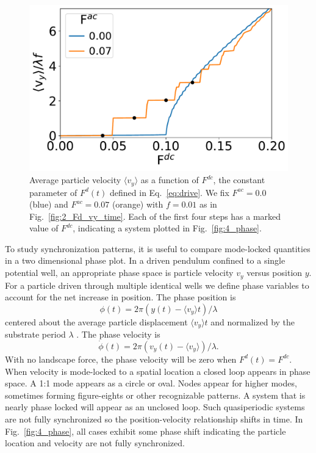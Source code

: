 \documentclass[twocolumn,preprintnumbers,amsmath,amssymb,aps,prb]{revtex4}
\begin{document}
\begin{figure} %
\centering
\includegraphics[width=\columnwidth]{fig3_sweep_vyFDC.pdf}
\caption{Average particle velocity  $\langle v_{y} \rangle$
  as a function of $F^{dc}$, 
  the constant parameter of $F^d(t)$ defined in Eq.~\ref{eq:drive}.
  We fix
  $F^{ac}=0.0$ (blue) and 
  $F^{ac}=0.07$ (orange) with $f = 0.01$ 
  as in Fig.~\ref{fig:2_Fd_vy_time}.
  Each of the first four steps
  has a marked value of $F^{dc}$,
  indicating a system
  plotted in Fig.~\ref{fig:4_phase}.
}
\label{fig:3_sweep_vyFDC}
\end{figure}

  To study synchronization patterns, 
  it is useful to compare
  mode-locked quantities 
  in a two dimensional phase plot. 
  In a driven pendulum confined to a single potential well,
  an appropriate
  phase space is particle velocity $v_y$ versus position $y$.  
  For a particle driven 
  through multiple identical wells 
  we define phase variables 
  to account for the net increase in position.
  The phase position is
  \begin{equation}
    \phi(t) = 2\pi (y(t)-\langle v_y \rangle t)/\lambda
  \end{equation}
  centered about the average particle displacement $\langle v_y \rangle t$
  and normalized by the substrate period $\lambda$ \cite{Juniper2015}.
  The phase velocity is
  \begin{equation}
    \dot{\phi}(t) =2\pi (v_y(t)-\langle v_y \rangle) /\lambda.  
  \end{equation}
  With no landscape force, 
  the phase velocity will be zero when $F^d(t) = F^{dc}$.
  When velocity
  is mode-locked to 
  a spatial location
  a closed loop appears in  
  phase space. 
  A 1:1 mode appears as a circle or oval. 
  Nodes appear 
  for higher modes,
  sometimes forming figure-eights
  or other recognizable patterns.
  A system that is nearly phase locked
  will appear as an unclosed loop.
  Such quasiperiodic systems are
  not fully synchronized
  so the position-velocity relationship
  shifts in time.
  In Fig.~\ref{fig:4_phase}, 
  all cases exhibit some phase shift 
  indicating the particle location and velocity
  are not fully synchronized.
  
\end{document}
